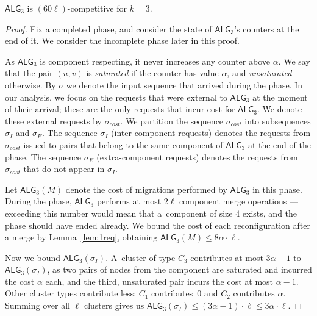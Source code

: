 \documentclass[a4paper,anonymous,USenglish]{lipics-v2019}
\newcommand{\TAlg}{{\ensuremath{\textsf{ALG}_{3}}}\xspace}
\begin{document}
\begin{theorem}
	\TAlg is $(60\ell)$-competitive for $k=3$.
\end{theorem}
\begin{proof}
	Fix a completed phase, and consider the state of \TAlg's counters at the end of it.
	We consider the incomplete phase later in this proof.
	
	As \TAlg is component respecting, it never increases any counter above $\alpha$.
	We say that the pair $(u, v)$ is \emph{saturated} if the counter has value $\alpha$, and \emph{unsaturated} otherwise.
	By $\sigma$ we denote the input sequence that arrived during the phase.
	In our analysis, we focus on the requests that were external to \TAlg at the moment of their arrival; these are the only requests that incur cost for \TAlg.
	We denote these external requests by $\sigma_{cost}$.
	We partition the sequence $\sigma_{cost}$ into subsequences $\sigma_I$ and $\sigma_E$.
	The sequence $\sigma_I$ (inter-component requests) denotes the requests from $\sigma_{cost}$ issued to pairs that belong to the same component of \TAlg at the end of the phase.
	The sequence $\sigma_E$ (extra-component requests) denotes the requests from $\sigma_{cost}$ that do not appear in $\sigma_I$.
	
	
	Let $\TAlg(M)$ denote the cost of migrations performed by \TAlg in this phase.
	During the phase, \TAlg performs at most $2 \ell$ component merge operations ---
	exceeding this number would mean that a~component of size $4$ exists, and the phase should have ended already.
	We bound the cost of each reconfiguration after a merge by Lemma~\ref{lem:1req}, obtaining $\TAlg(M) \leq 8\alpha\cdot\ell$.
	
	Now we bound $\TAlg(\sigma_I)$.
	A~cluster of type $C_3$ contributes at most $3 \alpha - 1$ to $\TAlg(\sigma_I)$, as two pairs of nodes from the component are saturated and incurred the cost $\alpha$ each, and the third, unsaturated pair incurs the cost at most $\alpha-1$.
	Other cluster types contribute less: $C_1$ contributes~$0$ and $C_2$ contributes $\alpha$.
	Summing over all $\ell$ clusters gives us $\TAlg(\sigma_I) \leq (3 \alpha-1)\cdot \ell \leq 3\alpha\cdot\ell$.
	

\end{proof}
\end{document}
